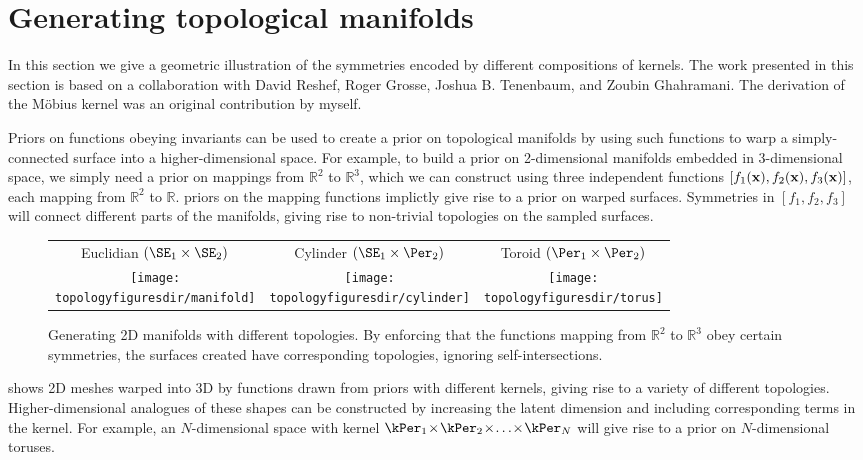 \section{Generating topological manifolds}
\label{sec:topological-manifolds}

In this section we give a geometric illustration of the symmetries encoded by different compositions of kernels.
The work presented in this section is based on a collaboration with David Reshef, Roger Grosse, Joshua B. Tenenbaum, and Zoubin Ghahramani.
The derivation of the M\"obius kernel was an original contribution by myself.

Priors on functions obeying invariants can be used to create a prior on topological manifolds by using such functions to warp a simply-connected surface into a higher-dimensional space.
For example, to build a prior on 2-dimensional manifolds embedded in 3-dimensional space, we simply need a prior on mappings from $\mathbb{R}^2$ to $\mathbb{R}^3$, which we can construct using three independent functions $[f_1({\bf{x}}), f_2({\bf{x}}), f_3({\bf{x}})]$, each mapping from $\mathbb{R}^2$ to $\mathbb{R}$.
\gp{} priors on the mapping functions implictly give rise to a prior on warped surfaces.
Symmetries in $[f_1, f_2, f_3]$ will connect different parts of the manifolds, giving rise to non-trivial topologies on the sampled surfaces.
%
\begin{figure}
\renewcommand{\tabcolsep}{1mm}
\begin{tabular}{ccc}
Euclidian $( \SE_1 \times \SE_2 )$  & Cylinder $( \SE_1 \times \Per_2 )$ & Toroid $( \Per_1 \times \Per_2 )$\\
\hspace{-0.5cm}\texttt{[image: \\topologyfiguresdir/manifold]} &
\texttt{[image: \\topologyfiguresdir/cylinder]} &
\texttt{[image: \\topologyfiguresdir/torus]} \\
\end{tabular}
\caption[Generating 2D manifolds with different topological structures]{
Generating 2D manifolds with different topologies.
By enforcing that the functions mapping from $\mathbb{R}^2$ to $\mathbb{R}^3$ obey certain symmetries, the surfaces created have corresponding topologies, ignoring self-intersections.
}
\label{fig:gen_surf}
\end{figure}
%
 shows 2D meshes warped into 3D by functions drawn from \gp{} priors with different kernels, giving rise to a variety of different topologies.
%
Higher-dimensional analogues of these shapes can be constructed by increasing the latent dimension and including corresponding terms in the kernel.
For example, an $N$-dimensional space with kernel $\kPer_1 \kerntimes \kPer_2 \kerntimes \ldots \kerntimes \kPer_N$ will give rise to a prior on $N$-dimensional toruses.

